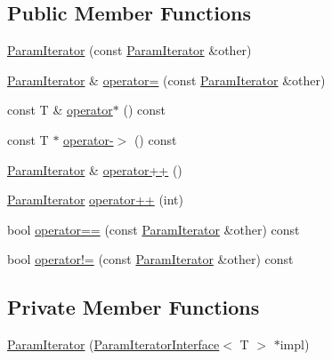 \subsection*{\-Public \-Member \-Functions}
\begin{DoxyCompactItemize}
\item 
\hyperlink{classtesting_1_1internal_1_1ParamIterator_ac3edbe7158ce05d3ff9ff4658b46715a}{\-Param\-Iterator} (const \hyperlink{classtesting_1_1internal_1_1ParamIterator}{\-Param\-Iterator} \&other)
\item 
\hyperlink{classtesting_1_1internal_1_1ParamIterator}{\-Param\-Iterator} \& \hyperlink{classtesting_1_1internal_1_1ParamIterator_a20d682e61104a114c62bd6322c8228b4}{operator=} (const \hyperlink{classtesting_1_1internal_1_1ParamIterator}{\-Param\-Iterator} \&other)
\item 
const \-T \& \hyperlink{classtesting_1_1internal_1_1ParamIterator_a0ad02595c2fdf7a496eda1d646060eab}{operator$\ast$} () const 
\item 
const \-T $\ast$ \hyperlink{classtesting_1_1internal_1_1ParamIterator_ab3d07abe897387f8cf2f097d1550b189}{operator-\/$>$} () const 
\item 
\hyperlink{classtesting_1_1internal_1_1ParamIterator}{\-Param\-Iterator} \& \hyperlink{classtesting_1_1internal_1_1ParamIterator_aa9bdfadcf099e2b99d6cec1cb104ec80}{operator++} ()
\item 
\hyperlink{classtesting_1_1internal_1_1ParamIterator}{\-Param\-Iterator} \hyperlink{classtesting_1_1internal_1_1ParamIterator_a395770af2eb7f2025e8467e83ce968a5}{operator++} (int)
\item 
bool \hyperlink{classtesting_1_1internal_1_1ParamIterator_a368788f883c9f3ce423ea93ee806cbd4}{operator==} (const \hyperlink{classtesting_1_1internal_1_1ParamIterator}{\-Param\-Iterator} \&other) const 
\item 
bool \hyperlink{classtesting_1_1internal_1_1ParamIterator_accac4dc70f4308d903a31ae1c6dfdffe}{operator!=} (const \hyperlink{classtesting_1_1internal_1_1ParamIterator}{\-Param\-Iterator} \&other) const 
\end{DoxyCompactItemize}
\subsection*{\-Private \-Member \-Functions}
\begin{DoxyCompactItemize}
\item 
\hyperlink{classtesting_1_1internal_1_1ParamIterator_ae179b752254d90012d9effbe669281f3}{\-Param\-Iterator} (\hyperlink{classtesting_1_1internal_1_1ParamIteratorInterface}{\-Param\-Iterator\-Interface}$<$ \-T $>$ $\ast$impl)
\end{DoxyCompactItemize}
